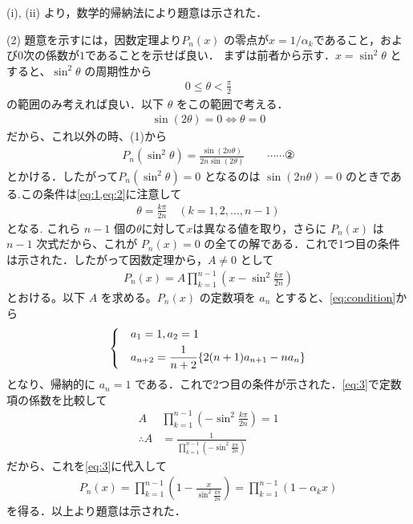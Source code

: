 \documentclass[a4paper,10pt]{ltjsarticle}
\begin{document}
\begin{multicols}{2}
(i), (ii) より，数学的帰納法により題意は示された．

\vspace{10pt}
(2) 題意を示すには，因数定理より$P_n(x)$ の零点が$x=1/\alpha_{k}$であること，および$0$次の係数が$1$であることを示せば良い．
まずは前者から示す．$x=\sin^2\theta$ とすると、$\sin^2\theta$ の周期性から
\begin{align}\label{eq:1}
 0 \le \theta < \frac{\pi}{2}
\end{align}
の範囲のみ考えれば良い．以下 $\theta$ をこの範囲で考える．
\begin{align}\label{eq:2}
 \sin(2\theta) = 0 \Leftrightarrow \theta = 0 
\end{align}
だから、これ以外の時、(1)から
\begin{align*}
  P_n(\sin^2\theta) = \frac{\sin(2n\theta)}{2n\sin(2\theta)} \qquad \cdots\cdots ②
\end{align*}
とかける．したがって$P_n(\sin^2\theta)=0$ となるのは $\sin(2n\theta)=0$ のときである.この条件は\cref{eq:1,eq:2}に注意して
\begin{align*}
  \theta = \frac{k\pi}{2n} \quad (k=1, 2, \dots, n-1)
\end{align*}
となる. これら $n-1$ 個の$\theta$に対して$x$は異なる値を取り，さらに $P_n(x)$ は $n-1$ 次式だから、これが $P_n(x)=0$ の全ての解である．これで1つ目の条件は示された．したがって因数定理から，$A\ne 0$ として
\begin{align}\label{eq:3}
  P_n(x) = A \prod_{k=1}^{n-1} \left(x - \sin^2\frac{k\pi}{2n}\right) 
\end{align}
とおける。以下 $A$ を求める。$P_n(x)$ の定数項を $a_n$ とすると、\cref{eq:condition}から
\begin{align}
 \begin{dcases} 
  & a_1=1, a_2=1 \\ 
  & a_{n+2} = \frac{1}{n+2}\{2(n+1)a_{n+1} - na_n\} 
\end{dcases}
\end{align}
となり、帰納的に $a_n=1$ である．これで2つ目の条件が示された．\cref{eq:3}で定数項の係数を比較して
\begin{align*}
  A &\prod_{k=1}^{n-1} \left(-\sin^2\frac{k\pi}{2n}\right) = 1 \\
  \therefore A &= \frac{1}{\prod_{k=1}^{n-1} \left(-\sin^2\frac{k\pi}{2n}\right)}
\end{align*}
だから、これを\cref{eq:3}に代入して
\begin{align}
  P_n(x) = \prod_{k=1}^{n-1} \left(1 - \frac{x}{\sin^2\frac{k\pi}{2n}}\right) = \prod_{k=1}^{n-1} (1-\alpha_k x) 
\end{align}
を得る．以上より題意は示された．


\end{multicols}
\end{document}
